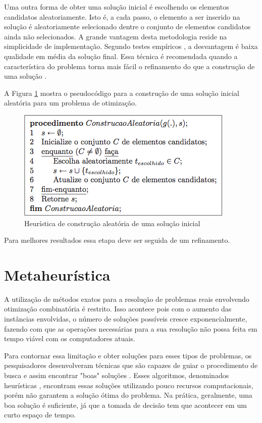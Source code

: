 Uma outra forma de obter uma solução inicial é escolhendo os elementos candidatos aleatoriamente. Isto é, a cada passo, o elemento a ser inserido na solução é aleatoriamente selecionado dentre o conjunto de elementos candidatos ainda não selecionados. A grande vantagem desta metodologia reside na simplicidade de implementação. Segundo testes empíricos , a desvantagem é baixa qualidade em média da solução final. Essa técnica é recomendada quando a característica do problema torna mais fácil o refinamento do que a construção de uma solução \citep{notasmarcone}. 

A Figura \ref{construcaoaleatoria} mostra o pseudocódigo para a construção de uma solução inicial aleatória para um problema de otimização.

\begin{figure}[ht]
	\centering
	\includegraphics[scale=0.7]{./img/construcaoaleatoria}
	\caption{Heurística de construção aleatória de uma solução inicial}
	\label{construcaoaleatoria}
\end{figure}

Para melhores resultados essa etapa deve ser seguida de um refinamento.

\section{Metaheurística}

A utilização de métodos exatos para a resolução de problemas reais envolvendo otimização combinatória é restrito. Isso acontece pois com o aumento das instâncias envolvidas, o número de soluções possíveis cresce exponencialmente, fazendo com que as operações necessárias para a sua resolução não possa feita em tempo viável com os computadores atuais.  

Para contornar essa limitação e obter soluções para esses tipos de problemas, os pesquisadores desenvolveram técnicas que são capazes de guiar o procedimento de busca e assim encontrar "boas" soluções \cite{maritan2009}. Esses algoritmos, denominados heurísticas \cite{dias2006}, encontram essas soluções utilizando pouco recursos computacionais, porém não garantem a solução ótima do problema. Na prática, geralmente, uma boa solução é suficiente, já que a tomada de decisão tem que acontecer em um curto espaço de tempo.

